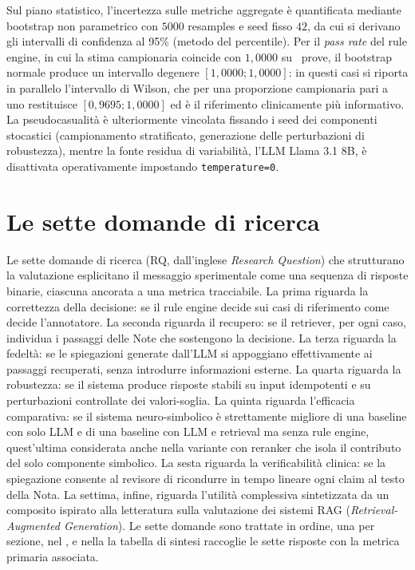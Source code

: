 Sul piano statistico, l'incertezza sulle metriche aggregate è quantificata mediante bootstrap non parametrico con $5000$ resamples e seed fisso $42$, da cui si derivano gli intervalli di confidenza al 95\% (metodo del percentile). Per il \emph{pass rate} del rule engine, in cui la stima campionaria coincide con $1{,}0000$ su \goldn\ prove, il bootstrap normale produce un intervallo degenere $[1{,}0000;1{,}0000]$: in questi casi si riporta in parallelo l'intervallo di Wilson, che per una proporzione campionaria pari a uno restituisce $[0{,}9695;1{,}0000]$ ed è il riferimento clinicamente più informativo. La pseudocasualità è ulteriormente vincolata fissando i seed dei componenti stocastici (campionamento stratificato, generazione delle perturbazioni di robustezza), mentre la fonte residua di variabilità, l'LLM Llama 3.1 8B, è disattivata operativamente impostando \texttt{temperature=0}.

\section{Le sette domande di ricerca}
\label{sec:rq}

Le sette domande di ricerca (RQ, dall'inglese \emph{Research Question}) che strutturano la valutazione esplicitano il messaggio sperimentale come una sequenza di risposte binarie, ciascuna ancorata a una metrica tracciabile. La prima riguarda la correttezza della decisione: se il rule engine decide sui casi di riferimento come decide l'annotatore. La seconda riguarda il recupero: se il retriever, per ogni caso, individua i passaggi delle Note che sostengono la decisione. La terza riguarda la fedeltà: se le spiegazioni generate dall'LLM si appoggiano effettivamente ai passaggi recuperati, senza introdurre informazioni esterne. La quarta riguarda la robustezza: se il sistema produce risposte stabili su input idempotenti e su perturbazioni controllate dei valori-soglia. La quinta riguarda l'efficacia comparativa: se il sistema neuro-simbolico è strettamente migliore di una baseline con solo LLM e di una baseline con LLM e retrieval ma senza rule engine, quest'ultima considerata anche nella variante con reranker che isola il contributo del solo componente simbolico. La sesta riguarda la verificabilità clinica: se la spiegazione consente al revisore di ricondurre in tempo lineare ogni claim al testo della Nota. La settima, infine, riguarda l'utilità complessiva sintetizzata da un composito ispirato alla letteratura sulla valutazione dei sistemi RAG (\emph{Retrieval-Augmented Generation}). Le sette domande sono trattate in ordine, una per sezione, nel , e nella  la tabella di sintesi raccoglie le sette risposte con la metrica primaria associata.

